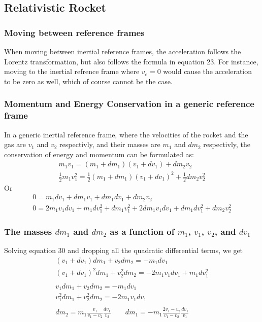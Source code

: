 \documentclass{article}
\begin{document}
\subsection{Relativistic Rocket}
\subsubsection{Moving between reference frames}
When moving between inertial reference frames, the acceleration follows the Lorentz transformation, but also follows the formula in equation 23. For instance, moving to the inertial refrence frame where $v_e = 0$ would cause the acceleration to be zero as well, which of course cannot be the case.
\subsubsection{Momentum and Energy Conservation in a generic reference frame}
In a generic inertial reference frame, where the velocities of the rocket and the gas are $v_1$ and $v_2$ respectivly, and their masses are $m_1$ and $dm_2$ respectivly, the conservation of energy and momentum can be formulated as:
\begin{equation}
\begin{gathered}
    m_1 v_1 = (m_1 + dm_1) (v_1 + dv_1) + dm_2 v_2 \\
    \frac{1}{2} m_1 v_1^2 = \frac{1}{2}(m_1 + dm_1) (v_1 + dv_1)^2 + \frac{1}{2}dm_2 v_2^2
\end{gathered}
\end{equation}
Or
\begin{equation}
\begin{gathered}
    0 = m_1 dv_1 + dm_1 v_1 + dm_1 dv_1 + dm_2 v_2 \\
    0 = 2 m_1 v_1 dv_1 + m_1 dv_1^2 + dm_1 v_1^2 + 2 dm_1 v_1 dv_1 + dm_1 dv_1^2 + dm_2 v_2^2 
\end{gathered}
\end{equation} 
\subsubsection{The masses $dm_1$ and $dm_2$ as a function of $m_1$, $v_1$, $v_2$, and $dv_1$}
Solving equation 30 and dropping all the quadratic differential terms, we get
\begin{equation}
\begin{gathered}
    (v_1 + dv_1) dm_1 + v_2 dm_2 = -m_1 dv_1 \\
    (v_1 + dv_1)^2dm_1 + v_2^2 dm_2 = -2m_1v_1dv_1 + m_1dv_1^2
    \\
    \\
    v_1 dm_1 + v_2 dm_2 = -m_1 dv_1 \\
    v_1^2 dm_1 + v_2^2 dm_2 = -2m_1v_1dv_1
    \\
    \\
    dm_2 = m_1 \frac{v_1}{v_1 - v_2} \frac{dv_1}{v_2}
    \qquad
    dm_1 = -m_1\frac{2v_1 - v_2}{v_1 - v_2}\frac{dv_1}{v_1}
\end{gathered}
\end{equation}
\end{document}
